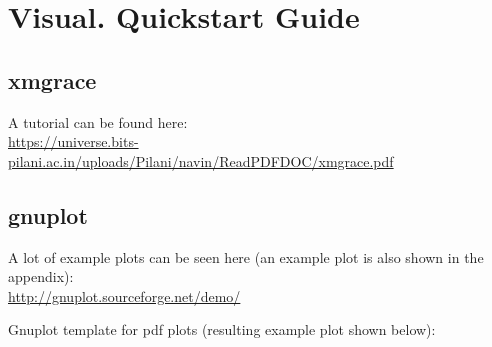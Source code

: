 \documentclass[
  letterpaper,
]{article}
\begin{document}
\hypertarget{visual.-quickstart-guide}{%
\section{Visual. Quickstart Guide}\label{visual.-quickstart-guide}}

\hypertarget{xmgrace}{%
\subsection{xmgrace}\label{xmgrace}}

A tutorial can be found here:\\
\url{https://universe.bits-pilani.ac.in/uploads/Pilani/navin/ReadPDFDOC/xmgrace.pdf}

\hypertarget{gnuplot}{%
\subsection{gnuplot}\label{gnuplot}}

A lot of example plots can be seen here (an example plot is also shown
in the appendix):\\
\url{http://gnuplot.sourceforge.net/demo/}

Gnuplot template for pdf plots (resulting example plot shown below):
\end{document}
